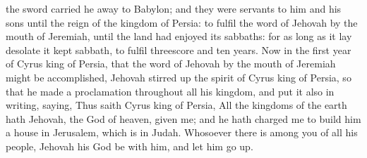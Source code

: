the sword carried he away to Babylon; and they were servants to him and his sons until the reign of the kingdom of Persia: to fulfil the word of Jehovah by the mouth of Jeremiah, until the land had enjoyed its sabbaths: for as long as it lay desolate it kept sabbath, to fulfil threescore and ten years.  Now in the first year of Cyrus king of Persia, that the word of Jehovah by the mouth of Jeremiah might be accomplished, Jehovah stirred up the spirit of Cyrus king of Persia, so that he made a proclamation throughout all his kingdom, and put it also in writing, saying, Thus saith Cyrus king of Persia, All the kingdoms of the earth hath Jehovah, the God of heaven, given me; and he hath charged me to build him a house in Jerusalem, which is in Judah. Whosoever there is among you of all his people, Jehovah his God be with him, and let him go up. 